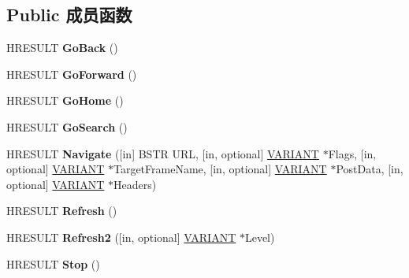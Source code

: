 \subsection*{Public 成员函数}
\begin{DoxyCompactItemize}
\item 
\mbox{\label{interface_s_h_doc_vw_1_1_i_web_browser_a13b2e71987de6b31303729aea7483881}} 
H\+R\+E\+S\+U\+LT {\bfseries Go\+Back} ()
\item 
\mbox{\label{interface_s_h_doc_vw_1_1_i_web_browser_a826847cd0b6f55308a70d1cf0f21b762}} 
H\+R\+E\+S\+U\+LT {\bfseries Go\+Forward} ()
\item 
\mbox{\label{interface_s_h_doc_vw_1_1_i_web_browser_a70d591f4d372bd17f19fe7a45515087d}} 
H\+R\+E\+S\+U\+LT {\bfseries Go\+Home} ()
\item 
\mbox{\label{interface_s_h_doc_vw_1_1_i_web_browser_a7f4edcb5edb41aa5521ae752db98b217}} 
H\+R\+E\+S\+U\+LT {\bfseries Go\+Search} ()
\item 
\mbox{\label{interface_s_h_doc_vw_1_1_i_web_browser_a720230f49b30b2f4a0a698fff4a0d811}} 
H\+R\+E\+S\+U\+LT {\bfseries Navigate} (\mbox{[}in\mbox{]} B\+S\+TR U\+RL, \mbox{[}in, optional\mbox{]} \hyperlink{structtag_v_a_r_i_a_n_t}{V\+A\+R\+I\+A\+NT} $\ast$Flags, \mbox{[}in, optional\mbox{]} \hyperlink{structtag_v_a_r_i_a_n_t}{V\+A\+R\+I\+A\+NT} $\ast$Target\+Frame\+Name, \mbox{[}in, optional\mbox{]} \hyperlink{structtag_v_a_r_i_a_n_t}{V\+A\+R\+I\+A\+NT} $\ast$Post\+Data, \mbox{[}in, optional\mbox{]} \hyperlink{structtag_v_a_r_i_a_n_t}{V\+A\+R\+I\+A\+NT} $\ast$Headers)
\item 
\mbox{\label{interface_s_h_doc_vw_1_1_i_web_browser_a56003311811b4835b86ffe81e5215e6b}} 
H\+R\+E\+S\+U\+LT {\bfseries Refresh} ()
\item 
\mbox{\label{interface_s_h_doc_vw_1_1_i_web_browser_ab9c8b3e2bc4485e84f9dc36494ec8614}} 
H\+R\+E\+S\+U\+LT {\bfseries Refresh2} (\mbox{[}in, optional\mbox{]} \hyperlink{structtag_v_a_r_i_a_n_t}{V\+A\+R\+I\+A\+NT} $\ast$Level)
\item 
\mbox{\label{interface_s_h_doc_vw_1_1_i_web_browser_a23e1e8c3397010ebaf7e9a460f95f1df}} 
H\+R\+E\+S\+U\+LT {\bfseries Stop} ()
\end{DoxyCompactItemize}
